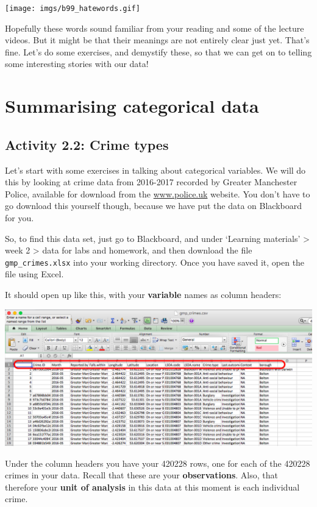 \documentclass[
]{book}
\begin{document}
\texttt{[image: imgs/b99\_hatewords.gif]}

Hopefully these words sound familiar from your reading and some of the lecture videos. But it might be that their meanings are not entirely clear just yet. That's fine. Let's do some exercises, and demystify these, so that we can get on to telling some interesting stories with our data!

\hypertarget{summarising-categorical-data}{%
\section{Summarising categorical data}\label{summarising-categorical-data}}

\hypertarget{activity-2.2-crime-types}{%
\subsection{Activity 2.2: Crime types}\label{activity-2.2-crime-types}}

Let's start with some exercises in talking about categorical variables. We will do this by looking at crime data from 2016-2017 recorded by Greater Manchester Police, available for download from the \href{https://www.police.uk/}{www.police.uk} website. You don't have to go download this yourself though, because we have put the data on Blackboard for you.

So, to find this data set, just go to Blackboard, and under `Learning materials' \textgreater{} week 2 \textgreater{} data for labs and homework, and then download the file \texttt{gmp\_crimes.xlsx} into your working directory. Once you have saved it, open the file using Excel.

It should open up like this, with your \textbf{variable} names as column headers:

\includegraphics{imgs/open_gmp_crimes.png}

Under the column headers you have your 420228 rows, one for each of the 420228 crimes in your data. Recall that these are your \textbf{observations}. Also, that therefore your \textbf{unit of analysis} in this data at this moment is each individual crime.
\end{document}
